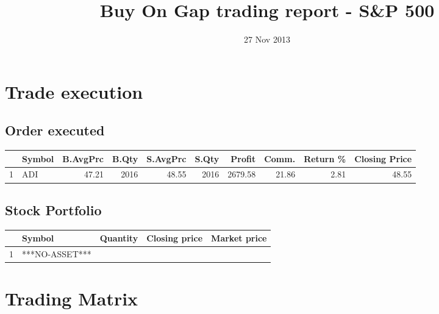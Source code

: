\documentclass{tufte-handout}\usepackage[]{graphicx}\usepackage[]{color}
\title{Buy On Gap trading report - S\&P 500}
\date{ 27 Nov 2013 }
\begin{document}
\maketitle


\section{Trade execution}
\subsection{Order executed}

\begin{table}[ht]
\centering
\begin{tabular}{llrrrrrrr|r}
  \hline
 & Symbol & B.AvgPrc & B.Qty & S.AvgPrc & S.Qty & Profit & Comm. & Return \% & Closing Price \\ 
  \hline
1 & ADI & 47.21 & 2016 & 48.55 & 2016 & 2679.58 & 21.86 & 2.81 & 48.55 \\ 
   \hline
\end{tabular}
\end{table}



\subsection{Stock Portfolio}
\begin{table}[ht]
\centering
\begin{tabular}{llrrr}
  \hline
 & Symbol & Quantity & Closing price & Market price \\ 
  \hline
1 & ***NO-ASSET*** &  &  &  \\ 
   \hline
\end{tabular}
\end{table}



\section{Trading Matrix}
\end{document}
